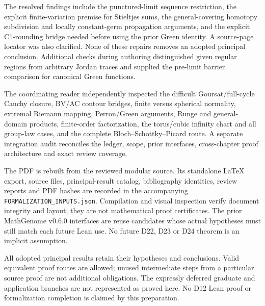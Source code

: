 \documentclass[11pt,a4paper,openany]{book}
\theoremstyle{definition}
\theoremstyle{remark}\newtheorem{remark}[theorem]{Remark}
\begin{document}
The resolved findings include the punctured-limit sequence restriction,
the explicit finite-variation premise for Stieltjes sums, the general-covering
homotopy subdivision and locally constant-germ propagation arguments, and the
explicit C1-rounding bridge needed before using the prior Green identity.
A source-page locator was also clarified. None of these repairs removes an
adopted principal conclusion. Additional checks during authoring distinguished
given regular regions from arbitrary Jordan traces and supplied the
pre-limit barrier comparison for canonical Green functions.

The coordinating reader independently inspected the difficult Goursat/full-cycle
Cauchy closure, BV/AC contour bridges, finite versus spherical normality,
extremal Riemann mapping, Perron/Green arguments, Runge and general-domain
products, finite-order factorization, the torus/cubic infinity chart and all
group-law cases, and the complete Bloch--Schottky--Picard route. A separate
integration audit reconciles the ledger, scope, prior interfaces, cross-chapter
proof architecture and exact review coverage.

The PDF is rebuilt from the reviewed modular source. Its standalone LaTeX
export, source files, principal-result catalog, bibliography identities,
review reports and PDF hashes are recorded in the accompanying
\texttt{FORMALIZATION\_INPUTS.json}. Compilation and visual inspection verify
document integrity and layout; they are not mathematical proof certificates.
The prior MathGenome v0.6.0 interfaces are reuse candidates whose actual
hypotheses must still match each future Lean use. No future D22, D23 or D24
theorem is an implicit assumption.

All adopted principal results retain their hypotheses and conclusions.
Valid equivalent proof routes are allowed; unused intermediate steps from a
particular source proof are not additional obligations. The expressly deferred
graduate and application branches are not represented as proved here.
No D12 Lean proof or formalization completion is claimed by this preparation.

\end{document}

